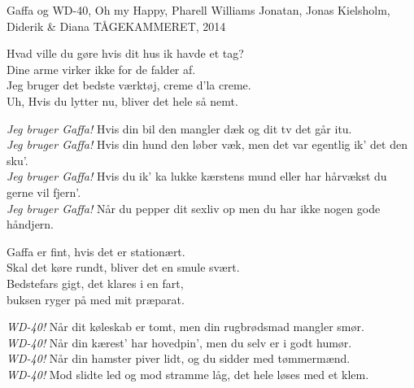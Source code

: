 \begin{song}{Gaffa og WD-40, Oh my}
  {} %
  {Happy, Pharell Williams} %
  {Jonatan, Jonas Kielsholm, Diderik \& Diana} %
  {TÅGEKAMMERET, 2014} %
  {\NotCCLIed} %

  \begin{SBVerse}
    Hvad ville du gøre hvis dit hus ik havde et tag?\\
    Dine arme virker ikke for de falder af.\\
    Jeg bruger det bedste værktøj, creme d’la creme.\\
    Uh, Hvis du lytter nu, bliver det hele så nemt.
  \end{SBVerse}

  \begin{SBChorus}
    \emph{Jeg bruger Gaffa!}
    Hvis din bil den mangler dæk og dit tv det går itu.\\
    \emph{Jeg bruger Gaffa!}
    Hvis din hund den løber væk, men det var egentlig ik’ det den sku’.\\
    \emph{Jeg bruger Gaffa!}
    Hvis du ik’ ka lukke kærstens mund eller har hårvækst du gerne vil fjern’.\\
    \emph{Jeg bruger Gaffa!}
    Når du pepper dit sexliv op men du har ikke nogen gode håndjern.
  \end{SBChorus}

  \begin{SBVerse}
    Gaffa er fint, hvis det er stationært.\\
    Skal det køre rundt, bliver det en smule svært.\\
    Bedstefars gigt, det klares i en fart,\\
    buksen ryger på med mit præparat.
  \end{SBVerse}

  \begin{SBChorus}
    \emph{WD-40!} Når dit køleskab er tomt, men din rugbrødsmad mangler smør.\\
    \emph{WD-40!} Når din kærest’ har hovedpin’, men du selv er i godt humør.\\
    \emph{WD-40!} Når din hamster piver lidt, og du sidder med tømmermænd.\\
    \emph{WD-40!} Mod slidte led og mod stramme låg, det hele løses med et klem.
  \end{SBChorus}


\end{song}
